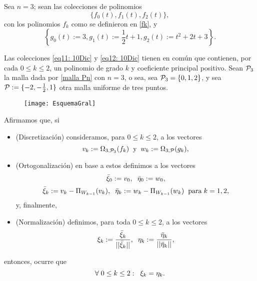 \begin{ejemplo}
Sea $n=3$; sean las colecciones de polinomios
\begin{equation}
\label{eq11: 10Dic}
\{
f_{0}(t), 
f_{1}(t), f_{2}(t) \},
\end{equation}
con los polinomios $f_{k}$ como se definieron en \eqref{fk}, y
\begin{equation}
\label{eq12: 10Dic}
\left\{
g_{0}(t):=3,  
g_{1}(t):=\frac{1}{2}t+1,
g_{2}(t):=t^{2}+2t+3 \right\}.
\end{equation}

Las colecciones \eqref{eq11: 10Dic} y \eqref{eq12: 10Dic}
tienen en común que contienen, por cada $0 \leq k \leq 2$,
un polinomio de grado $k$ y coeficiente principal positivo.
Sean $\mathcal{P}_{3}$ la malla dada por 
\eqref{malla Pn} con $n=3$, o sea, sea 
$\mathcal{P}_{3}=\{0, 1, 2 \}$, y sea $\mathcal{P}:= \{
-2, -\frac{1}{2}, 1 \}$ otra malla uniforme de tres puntos.


\begin{figure}[H]
	\centering
	\texttt{[image: EsquemaGral]} 
\end{figure}	

Afirmamos que, si
\begin{itemize}
\item \textcolor{ameMorado}{{(Discretización)}}
consideramos, para $0 \leq k \leq 2$, a los vectores
\[
v_{k}:= \Omega_{3, \mathcal{P}_{3}}(f_{k})
\hspace{0.2cm} \text{y} \hspace{0.2cm}
w_{k}:= \Omega_{3, \mathcal{P}}(g_{k}),
\]
\item \textcolor{ameMorado}{{(Ortogonalización)}}
en base a estos definimos a los vectores
$$ \bar{\xi}_{0}:= v_{0}, 
\hspace{0.2cm} \bar{\eta}_{0}:= w_{0}, 
$$
$$ \bar{\xi}_{k}:= v_{k} - \Pi_{W_{k-1}}(v_{k}), \hspace{0.2cm}
\bar{\eta}_{k}:= w_{k} - \Pi_{W_{k-1}}(w_{k})
\hspace{0.2cm} \text{para} 
\hspace{0.1cm}
k=1,2, $$ y, finalmente, 
\item \textcolor{ameMorado}{{(Normalización)}}
definimos, para toda $0 \leq k \leq 2$,
a los vectores
$$\xi_{k}:= \frac{\bar{\xi}_{k}}{|| \bar{\xi}_{k} ||},
\hspace{0.2cm}
\eta_{k}:= \frac{\bar{\eta}_{k}}{|| \bar{\eta}_{k} ||},
$$
\end{itemize}
entonces, ocurre que
\[
\forall \hspace{0.1cm} 0 \leq k \leq 2:
\hspace{0.2cm} \xi_{k}= \eta_{k}.
\]
\final
\end{ejemplo}

